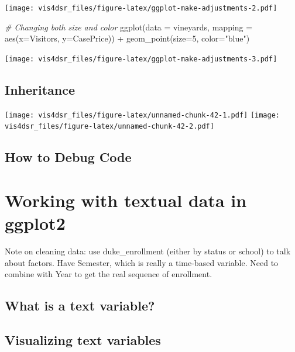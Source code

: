 \documentclass[
]{krantz}
\makeatletter
\newenvironment{Shaded}{\begin{snugshade}}{\end{snugshade}}
\newcommand{\AttributeTok}[1]{\textcolor[rgb]{0.61,0.61,0.61}{#1}}
\newcommand{\CommentTok}[1]{\textcolor[rgb]{0.37,0.37,0.37}{\textit{#1}}}
\newcommand{\DecValTok}[1]{\textcolor[rgb]{0.06,0.06,0.06}{#1}}
\newcommand{\FunctionTok}[1]{\textcolor[rgb]{0,0,0}{#1}}
\newcommand{\NormalTok}[1]{#1}
\newcommand{\SpecialCharTok}[1]{\textcolor[rgb]{0,0,0}{#1}}
\newcommand{\StringTok}[1]{\textcolor[rgb]{0.5,0.5,0.5}{#1}}
\newenvironment{kframe}{%
\medskip{}
\setlength{\fboxsep}{.8em}
 \def\at@end@of@kframe{}%
 \ifinner\ifhmode%
  \def\at@end@of@kframe{\end{minipage}}%
  \begin{minipage}{\columnwidth}%
 \fi\fi%
 \def\FrameCommand##1{\hskip\@totalleftmargin \hskip-\fboxsep
 \colorbox{shadecolor}{##1}\hskip-\fboxsep
     \hskip-\linewidth \hskip-\@totalleftmargin \hskip\columnwidth}%
 \MakeFramed {\advance\hsize-\width
   \@totalleftmargin\z@ \linewidth\hsize
   \@setminipage}}%
 {\par\unskip\endMakeFramed%
 \at@end@of@kframe}
\renewenvironment{Shaded}{\begin{kframe}}{\end{kframe}}
\makeatother
\begin{document}
\texttt{[image: vis4dsr\_files/figure-latex/ggplot-make-adjustments-2.pdf]}

\begin{Shaded}
\begin{Highlighting}[]
\CommentTok{\# Changing both size and color}
\FunctionTok{ggplot}\NormalTok{(}\AttributeTok{data =}\NormalTok{ vineyards, }\AttributeTok{mapping =} \FunctionTok{aes}\NormalTok{(}\AttributeTok{x=}\NormalTok{Visitors, }\AttributeTok{y=}\NormalTok{CasePrice)) }\SpecialCharTok{+}
  \FunctionTok{geom\_point}\NormalTok{(}\AttributeTok{size=}\DecValTok{5}\NormalTok{, }\AttributeTok{color=}\StringTok{"blue"}\NormalTok{)}
\end{Highlighting}
\end{Shaded}

\texttt{[image: vis4dsr\_files/figure-latex/ggplot-make-adjustments-3.pdf]}

\hypertarget{inheritance}{%
\section{Inheritance}\label{inheritance}}

\texttt{[image: vis4dsr\_files/figure-latex/unnamed-chunk-42-1.pdf]} \texttt{[image: vis4dsr\_files/figure-latex/unnamed-chunk-42-2.pdf]}

\hypertarget{how-to-debug-code}{%
\section{How to Debug Code}\label{how-to-debug-code}}

\hypertarget{text-data-visualizations}{%
\chapter{Working with textual data in ggplot2}\label{text-data-visualizations}}

Note on cleaning data: use duke\_enrollment (either by status or school) to talk about factors.
Have Semester, which is really a time-based variable. Need to combine with Year
to get the real sequence of enrollment.

\hypertarget{what-is-a-text-variable}{%
\section{What is a text variable?}\label{what-is-a-text-variable}}

\hypertarget{visualizing-text-variables}{%
\section{Visualizing text variables}\label{visualizing-text-variables}}
\end{document}
